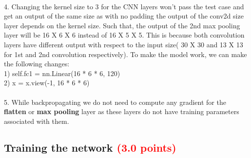 \documentclass[answers]{exam}
\newcommand{\mypoints}[1]{\textcolor{red}{(#1 points)}}
\begin{document}
\begin{solution}
\\
4. Changing the kernel size to 3 for the CNN layers won't pass the test case and get an output of the same size as with no padding the output of the conv2d size layer depends on the kernel size. Such that, the output of the 2nd max pooling layer will be 16 X 6 X 6 instead of 16 X 5 X 5. This is because both convolution layers have different output with respect to the input size( 30 X 30 and 13 X 13 for 1st and 2nd convolution respectively).
To make the model work, we can make the following changes:\\
1) self.fc1 = nn.Linear(16 * 6 * 6, 120)\\
2) x = x.view(-1, 16 * 6 * 6)\\
\\
5. While backpropagating we do not need to compute any gradient for the \textbf{flatten} or \textbf{max pooling} layer as these layers do not have training parameters associated with them.
\end{solution}

\subsection{Training the network \mypoints{3.0}}
\end{document}
